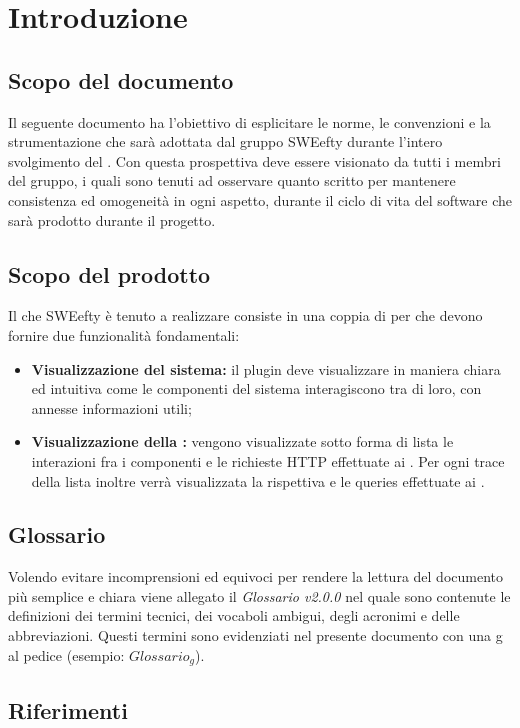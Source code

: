 \section{Introduzione}
\label{sec:intro}
\subsection{Scopo del documento}
Il seguente documento ha l'obiettivo di esplicitare le norme, le convenzioni e la strumentazione che sarà adottata dal gruppo SWEefty durante l'intero svolgimento del . Con questa prospettiva deve essere visionato da tutti i membri del gruppo, i quali sono tenuti ad osservare quanto scritto per mantenere consistenza ed omogeneità in ogni aspetto, durante il ciclo di vita del software che sarà prodotto durante il progetto.
\subsection{Scopo del prodotto}
	Il  che SWEefty è tenuto a realizzare consiste in una coppia di  per  che devono fornire due funzionalità fondamentali:
	\begin{itemize}
		\item \textbf{Visualizzazione  del sistema:} il plugin deve visualizzare in maniera chiara ed intuitiva come le componenti del sistema interagiscono tra di loro, con annesse informazioni utili;
		\item \textbf{Visualizzazione della :} vengono visualizzate sotto forma di lista le interazioni fra i componenti e le richieste HTTP effettuate ai . Per ogni trace della lista inoltre verrà visualizzata la rispettiva  e le queries effettuate ai .
	\end{itemize}

\subsection{Glossario}
	Volendo evitare incomprensioni  ed equivoci per rendere la lettura del documento più semplice e chiara viene allegato il \emph{Glossario v2.0.0} nel quale sono contenute le definizioni dei termini tecnici, dei vocaboli ambigui, degli acronimi e delle abbreviazioni. Questi termini sono evidenziati nel presente documento con una g al pedice (esempio: $Glossario_{g}$).

\subsection{Riferimenti}
